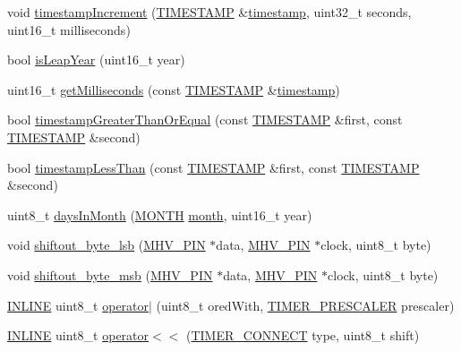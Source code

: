 \begin{DoxyCompactItemize}
\item 
void \hyperlink{namespacemhvlib_a62a5d211e5a6e76c2866d48dcd84c734}{timestamp\-Increment} (\hyperlink{namespacemhvlib_ae0658d1591e8aabca3a4b259a0c483cd}{T\-I\-M\-E\-S\-T\-A\-M\-P} \&\hyperlink{structmhvlib_1_1timestamp}{timestamp}, uint32\-\_\-t seconds, uint16\-\_\-t milliseconds)
\item 
bool \hyperlink{namespacemhvlib_a69b8a887a6723de20794fb1f5c12388b}{is\-Leap\-Year} (uint16\-\_\-t year)
\item 
uint16\-\_\-t \hyperlink{namespacemhvlib_aeaa3844d746c773ae1cb7d34e314d42d}{get\-Milliseconds} (const \hyperlink{namespacemhvlib_ae0658d1591e8aabca3a4b259a0c483cd}{T\-I\-M\-E\-S\-T\-A\-M\-P} \&\hyperlink{structmhvlib_1_1timestamp}{timestamp})
\item 
bool \hyperlink{namespacemhvlib_a80aadacb231d8f3d8e630a4a49240b4d}{timestamp\-Greater\-Than\-Or\-Equal} (const \hyperlink{namespacemhvlib_ae0658d1591e8aabca3a4b259a0c483cd}{T\-I\-M\-E\-S\-T\-A\-M\-P} \&first, const \hyperlink{namespacemhvlib_ae0658d1591e8aabca3a4b259a0c483cd}{T\-I\-M\-E\-S\-T\-A\-M\-P} \&second)
\item 
bool \hyperlink{namespacemhvlib_adae779d2110756e948a326197ccec89e}{timestamp\-Less\-Than} (const \hyperlink{namespacemhvlib_ae0658d1591e8aabca3a4b259a0c483cd}{T\-I\-M\-E\-S\-T\-A\-M\-P} \&first, const \hyperlink{namespacemhvlib_ae0658d1591e8aabca3a4b259a0c483cd}{T\-I\-M\-E\-S\-T\-A\-M\-P} \&second)
\item 
uint8\-\_\-t \hyperlink{namespacemhvlib_ac0d737482b9041a1bf77e457a3898364}{days\-In\-Month} (\hyperlink{namespacemhvlib_a2406fef93804eb87fef77054c6a2082c}{M\-O\-N\-T\-H} \hyperlink{namespacemhvlib_ab6dc87074774414e8c185a46c7db18c3}{month}, uint16\-\_\-t year)
\item 
void \hyperlink{namespacemhvlib_a706d2cb44231209e5c2472e868f549b5}{shiftout\-\_\-byte\-\_\-lsb} (\hyperlink{namespacemhvlib_a3fc44352ee2826fe480452ba1acd5de7}{M\-H\-V\-\_\-\-P\-I\-N} $\ast$data, \hyperlink{namespacemhvlib_a3fc44352ee2826fe480452ba1acd5de7}{M\-H\-V\-\_\-\-P\-I\-N} $\ast$clock, uint8\-\_\-t byte)
\item 
void \hyperlink{namespacemhvlib_a83b8b1ae5aa048241ff663659462350a}{shiftout\-\_\-byte\-\_\-msb} (\hyperlink{namespacemhvlib_a3fc44352ee2826fe480452ba1acd5de7}{M\-H\-V\-\_\-\-P\-I\-N} $\ast$data, \hyperlink{namespacemhvlib_a3fc44352ee2826fe480452ba1acd5de7}{M\-H\-V\-\_\-\-P\-I\-N} $\ast$clock, uint8\-\_\-t byte)
\item 
\hyperlink{io_8h_a2eb6f9e0395b47b8d5e3eeae4fe0c116}{I\-N\-L\-I\-N\-E} uint8\-\_\-t \hyperlink{namespacemhvlib_af6b8de3202d479555161cdc8696758e7}{operator$|$} (uint8\-\_\-t ored\-With, \hyperlink{namespacemhvlib_ae280d2a7103fc576dbd0e8880c574e6c}{T\-I\-M\-E\-R\-\_\-\-P\-R\-E\-S\-C\-A\-L\-E\-R} prescaler)
\item 
\hyperlink{io_8h_a2eb6f9e0395b47b8d5e3eeae4fe0c116}{I\-N\-L\-I\-N\-E} uint8\-\_\-t \hyperlink{namespacemhvlib_a6e7077952ae7582b5593a6a8dcdc4b71}{operator$<$$<$} (\hyperlink{namespacemhvlib_a670ebf781e5447de855e589e9100e224}{T\-I\-M\-E\-R\-\_\-\-C\-O\-N\-N\-E\-C\-T} type, uint8\-\_\-t shift)
\end{DoxyCompactItemize}


